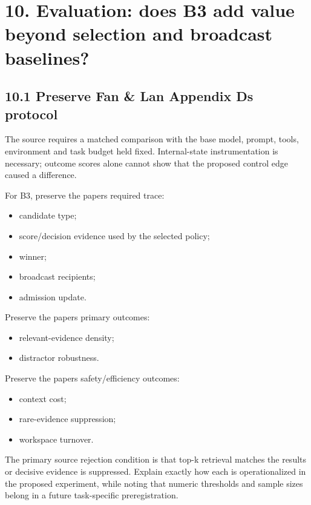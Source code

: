 \section{10. Evaluation: does B3 add value beyond selection and broadcast baselines?}\label{10-evaluation-does-b3-add-value-beyond-selection-and-broadcast-baselines}

\subsection{10.1 Preserve Fan \& Lan Appendix D\textquotesingle s protocol}\label{101-preserve-fan--lan-appendix-ds-protocol}

The source requires a matched comparison with the base model, prompt, tools, environment and task budget held fixed. Internal-state instrumentation is necessary; outcome scores alone cannot show that the proposed control edge caused a difference.

For B3, preserve the paper\textquotesingle s required trace:

\begin{itemize}
\tightlist
\item
  candidate type;
\item
  score/decision evidence used by the selected policy;
\item
  winner;
\item
  broadcast recipients;
\item
  admission update.
\end{itemize}

Preserve the paper\textquotesingle s primary outcomes:

\begin{itemize}
\tightlist
\item
  relevant-evidence density;
\item
  distractor robustness.
\end{itemize}

Preserve the paper\textquotesingle s safety/efficiency outcomes:

\begin{itemize}
\tightlist
\item
  context cost;
\item
  rare-evidence suppression;
\item
  workspace turnover.
\end{itemize}

The primary source rejection condition is that top-k retrieval matches the results or decisive evidence is suppressed. Explain exactly how each is operationalized in the proposed experiment, while noting that numeric thresholds and sample sizes belong in a future task-specific preregistration.


